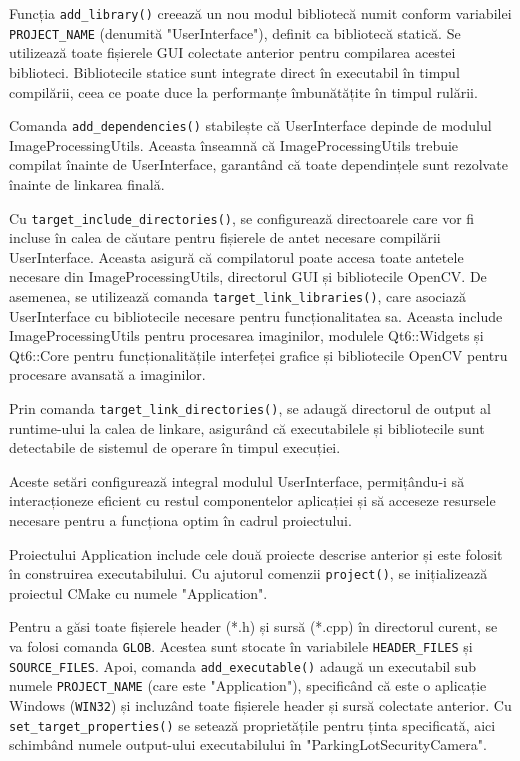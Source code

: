 \documentclass[a4paper,12pt]{report}
\begin{document}
Funcția \texttt{add\_library()} creează un nou modul bibliotecă numit conform variabilei \texttt{PROJECT\_NAME} (denumită "UserInterface"), definit ca bibliotecă statică. Se utilizează toate fișierele GUI colectate anterior pentru compilarea acestei biblioteci. Bibliotecile statice sunt integrate direct în executabil în timpul compilării, ceea ce poate duce la performanțe îmbunătățite în timpul rulării.

Comanda \texttt{add\_dependencies()} stabilește că UserInterface depinde de modulul ImageProcessingUtils. Aceasta înseamnă că ImageProcessingUtils trebuie compilat înainte de UserInterface, garantând că toate dependințele sunt rezolvate înainte de linkarea finală.

Cu \texttt{target\_include\_directories()}, se configurează directoarele care vor fi incluse în calea de căutare pentru fișierele de antet necesare compilării UserInterface. Aceasta asigură că compilatorul poate accesa toate antetele necesare din ImageProcessingUtils, directorul GUI și bibliotecile OpenCV. De asemenea, se utilizează comanda \texttt{target\_link\_libraries()}, care asociază UserInterface cu bibliotecile necesare pentru funcționalitatea sa. Aceasta include ImageProcessingUtils pentru procesarea imaginilor, modulele Qt6::Widgets și Qt6::Core pentru funcționalitățile interfeței grafice și bibliotecile OpenCV pentru procesare avansată a imaginilor.

Prin comanda \texttt{target\_link\_directories()}, se adaugă directorul de output al runtime-ului la calea de linkare, asigurând că executabilele și bibliotecile sunt detectabile de sistemul de operare în timpul execuției.

Aceste setări configurează integral modulul UserInterface, permițându-i să interacționeze eficient cu restul componentelor aplicației și să acceseze resursele necesare pentru a funcționa optim în cadrul proiectului.

Proiectului Application include cele două proiecte descrise anterior și este folosit în construirea executabilului. Cu ajutorul comenzii \texttt{project()}, se inițializează proiectul CMake cu numele "Application".

Pentru a găsi toate fișierele header (*.h) și sursă (*.cpp) în directorul curent, se va folosi comanda \texttt{GLOB}. Acestea sunt stocate în variabilele \texttt{HEADER\_FILES} și \texttt{SOURCE\_FILES}. Apoi, comanda \texttt{add\_executable()} adaugă un executabil sub numele \texttt{PROJECT\_NAME} (care este "Application"), specificând că este o aplicație Windows (\texttt{WIN32}) și incluzând toate fișierele header și sursă colectate anterior. Cu \texttt{set\_target\_properties()} se setează proprietățile pentru ținta specificată, aici schimbând numele output-ului executabilului în "ParkingLotSecurityCamera".
\end{document}
